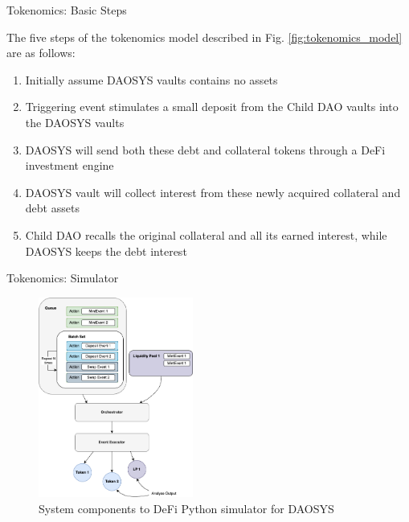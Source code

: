 \documentclass[10pt,xcolor=svgnames]{beamer} %
\begin{document}
\begin{frame}{Tokenomics: Basic Steps}

The five steps of the tokenomics model described in Fig. \ref{fig:tokenomics_model} are as follows:

\begin{enumerate}[label=\Alph*]
  \item Initially assume DAOSYS vaults contains no assets
  \item Triggering event stimulates a small deposit from the Child DAO vaults into the DAOSYS vaults
  \item DAOSYS will send both these debt and collateral tokens through a DeFi investment engine
  \item DAOSYS vault will collect interest from these newly acquired collateral and debt assets
  \item Child DAO recalls the original collateral and all its earned interest, while DAOSYS keeps the debt interest
\end{enumerate} 

\end{frame}


\begin{frame}{Tokenomics: Simulator}

\begin{figure}[h!]
\includegraphics[width=2in]{img/simulator.png}
\caption{System components to DeFi Python simulator for DAOSYS} 
\label{fig:daosys_simulator}
\end{figure}

\end{frame}
\end{document}
